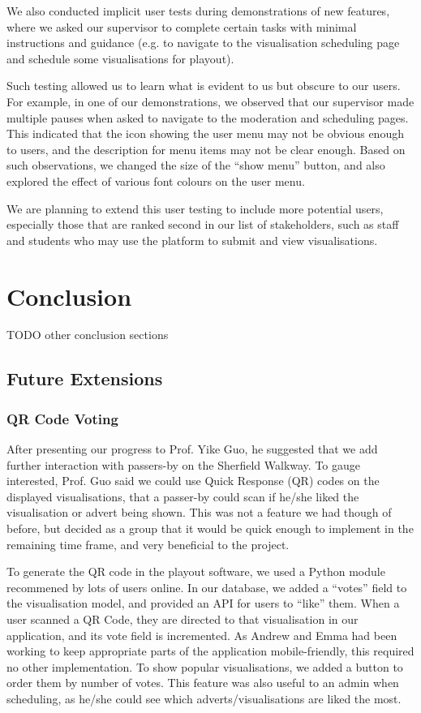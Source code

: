\documentclass[a4paper, titlepage]{article}
\begin{document}
We also conducted implicit user tests during demonstrations of new features, where we asked our supervisor to complete certain tasks with minimal instructions and guidance (e.g. to navigate to the visualisation scheduling page and schedule some visualisations for playout).

Such testing allowed us to learn what is evident to us but obscure to our users. For example, in one of our demonstrations, we observed that our supervisor made multiple pauses when asked to navigate to the moderation and scheduling pages. This indicated that the icon showing the user menu may not be obvious enough to users, and the description for menu items may not be clear enough. Based on such observations, we changed the size of the ``show menu'' button, and also explored the effect of various font colours on the user menu.

We are planning to extend this user testing to include more potential users, especially those that are ranked second in our list of stakeholders, such as staff and students who may use the platform to submit and 
view visualisations.







\newpage
\section{Conclusion}
TODO other conclusion sections

\subsection{Future Extensions}

\subsubsection{QR Code Voting}
After presenting our progress to Prof. Yike Guo, he suggested that we add further interaction with 
passers-by on the Sherfield Walkway. To gauge interested, Prof. Guo said we could use Quick Response 
(QR) codes on the displayed visualisations, that a passer-by could scan if he/she liked the 
visualisation or advert being shown. This was not a feature we had though of before, but decided as a 
group that it would be quick enough to implement in the remaining time frame, and very beneficial to
the project. 

To generate the QR code in the playout software, we used a Python module recommened by lots of users 
online. In our database, we added a ``votes'' field to the visualisation model, and provided an API
for users to ``like'' them. When a user scanned a QR Code, they are directed to that visualisation in 
our application, and its vote field is incremented. As Andrew and Emma had been working to keep 
appropriate parts of the application mobile-friendly, this required no other implementation. To show 
popular visualisations, we added a button to order them by number of votes. This feature was also 
useful to an admin when scheduling, as he/she could see which adverts/visualisations are liked the 
most. 
\end{document}
